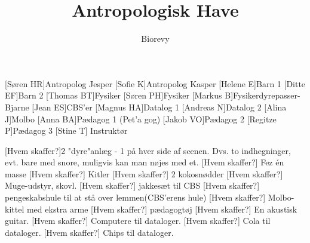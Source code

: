 \documentclass[a4paper,12pt]{article}
\title{Antropologisk Have}
\author{Biorevy}
\begin{document}
\maketitle




\begin{roles}
	[Søren HR]Antropolog Jesper 
	[Sofie K]Antropolog Kasper 
	[Helene E]Barn 1
	[Ditte EF]Barn 2
	[Thomas BT]Fysiker
	[Søren PH]Fysiker
	[Markus B]Fysikerdyrepasser-Bjarne
	[Jean ES]CBS'er
	[Magnus HA]Datalog 1
	[Andreas N]Datalog 2
	[Alina J]Molbo  
	[Anna BA]Pædagog 1 (Pet'a gog)
	[Jakob VO]Pædagog 2
	[Regitze P]Pædagog 3
	[Stine T] Instruktør
\end{roles}


\begin{props}
	[Hvem skaffer?]2 "dyre"anlæg - 1 på hver side af scenen. Dvs. to indhegninger, evt. bare med snore, muligvis kan man nøjes med et. 
	[Hvem skaffer?] Fez én masse
	[Hvem skaffer?] Kitler
	[Hvem skaffer?] 2 kokosnødder	
	[Hvem skaffer?] Muge-udstyr, skovl. 
	[Hvem skaffer?] jakkesæt til CBS
	[Hvem skaffer?] pengeskabshule til at stå over lemmen(CBS'erens hule)
	[Hvem skaffer?] Molbo-kittel med ekstra arme 
	[Hvem skaffer?] pædagogtøj
	[Hvem skaffer?] En akustisk guitar. 
	[Hvem skaffer?] Computere til dataloger. 
	[Hvem skaffer?] Cola til dataloger. 
	[Hvem skaffer?] Chips til dataloger. 
\end{props}
\end{document}
